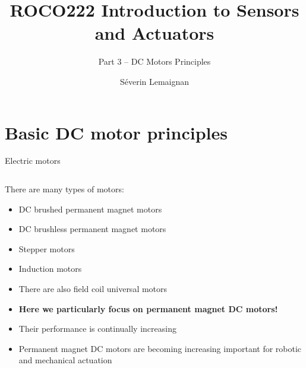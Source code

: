\documentclass[compress]{beamer}
\title{ROCO222 \newline Introduction to Sensors and Actuators}
\subtitle{Part 3 -- DC Motors Principles}
\date{}
\author{Séverin Lemaignan}
\institute{Centre for Neural Systems and Robotics\\{\bf Plymouth University}}
\begin{document}

\maketitle

\section{Basic DC motor principles}

\begin{frame}{Electric motors}
    \begin{columns}
        \begin{column}{0.7\linewidth}

    There are many types of motors:

    \begin{itemize}
        \item DC brushed permanent magnet motors
        \item DC brushless permanent magnet motors
        \item Stepper motors
        \item Induction motors
        \item There are also field coil universal motors
        \item \textbf{Here we particularly focus on permanent magnet DC motors!}
        \item Their performance is continually increasing
        \item Permanent magnet DC motors are becoming increasing important for
            robotic and mechanical actuation
    \end{itemize}


\end{column}
\end{columns}
\end{frame}
\end{document}
